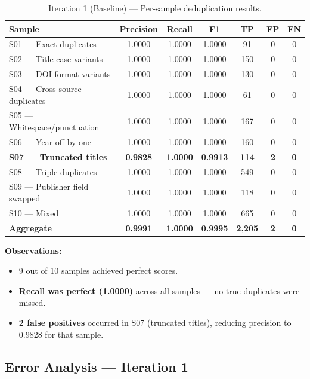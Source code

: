 \documentclass[conference]{IEEEtran}
\begin{document}
\begin{table}[htbp]
\centering
\caption{Iteration 1 (Baseline) --- Per-sample deduplication results.}
\label{tab:iter1}
\begin{tabular}{@{}lcccccc@{}}
\toprule
\textbf{Sample} & \textbf{Precision} & \textbf{Recall} & \textbf{F1} & \textbf{TP} & \textbf{FP} & \textbf{FN} \\
\midrule
S01 --- Exact duplicates        & 1.0000 & 1.0000 & 1.0000 &  91 & 0 & 0 \\
S02 --- Title case variants     & 1.0000 & 1.0000 & 1.0000 & 150 & 0 & 0 \\
S03 --- DOI format variants     & 1.0000 & 1.0000 & 1.0000 & 130 & 0 & 0 \\
S04 --- Cross-source duplicates & 1.0000 & 1.0000 & 1.0000 &  61 & 0 & 0 \\
S05 --- Whitespace/punctuation  & 1.0000 & 1.0000 & 1.0000 & 167 & 0 & 0 \\
S06 --- Year off-by-one         & 1.0000 & 1.0000 & 1.0000 & 160 & 0 & 0 \\
\textbf{S07 --- Truncated titles} & \textbf{0.9828} & \textbf{1.0000} & \textbf{0.9913} & \textbf{114} & \textbf{2} & \textbf{0} \\
S08 --- Triple duplicates       & 1.0000 & 1.0000 & 1.0000 & 549 & 0 & 0 \\
S09 --- Publisher field swapped & 1.0000 & 1.0000 & 1.0000 & 118 & 0 & 0 \\
S10 --- Mixed                   & 1.0000 & 1.0000 & 1.0000 & 665 & 0 & 0 \\
\midrule
\textbf{Aggregate} & \textbf{0.9991} & \textbf{1.0000} & \textbf{0.9995} & \textbf{2{,}205} & \textbf{2} & \textbf{0} \\
\bottomrule
\end{tabular}
\end{table}

\noindent\textbf{Observations:}
\begin{itemize}
    \item 9 out of 10 samples achieved perfect scores.
    \item \textbf{Recall was perfect (1.0000)} across all samples --- no true duplicates were missed.
    \item \textbf{2 false positives} occurred in S07 (truncated titles), reducing precision to 0.9828 for that sample.
\end{itemize}

\subsection{Error Analysis --- Iteration 1}
\end{document}
